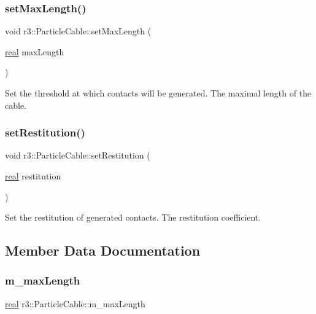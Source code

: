 \subsubsection{\texorpdfstring{set\+Max\+Length()}{setMaxLength()}}
{\footnotesize\ttfamily void r3\+::\+Particle\+Cable\+::set\+Max\+Length (\begin{DoxyParamCaption}\item[{\mbox{\hyperlink{namespacer3_ab2016b3e3f743fb735afce242f0dc1eb}{real}}}]{max\+Length }\end{DoxyParamCaption})}



Set the threshold at which contacts will be generated.  The maximal length of the cable. 

\mbox{\label{classr3_1_1_particle_cable_a070f8df68fbf2b7a7b758f1c5b22c42c}} 
\subsubsection{\texorpdfstring{set\+Restitution()}{setRestitution()}}
{\footnotesize\ttfamily void r3\+::\+Particle\+Cable\+::set\+Restitution (\begin{DoxyParamCaption}\item[{\mbox{\hyperlink{namespacer3_ab2016b3e3f743fb735afce242f0dc1eb}{real}}}]{restitution }\end{DoxyParamCaption})}



Set the restitution of generated contacts.  The restitution coefficient. 



\subsection{Member Data Documentation}
\mbox{\label{classr3_1_1_particle_cable_a168d7ed5047dc94ae73f7eec4929ab4d}} 
\subsubsection{\texorpdfstring{m\+\_\+max\+Length}{m\_maxLength}}
{\footnotesize\ttfamily \mbox{\hyperlink{namespacer3_ab2016b3e3f743fb735afce242f0dc1eb}{real}} r3\+::\+Particle\+Cable\+::m\+\_\+max\+Length\hspace{0.3cm}{\ttfamily [protected]}}

